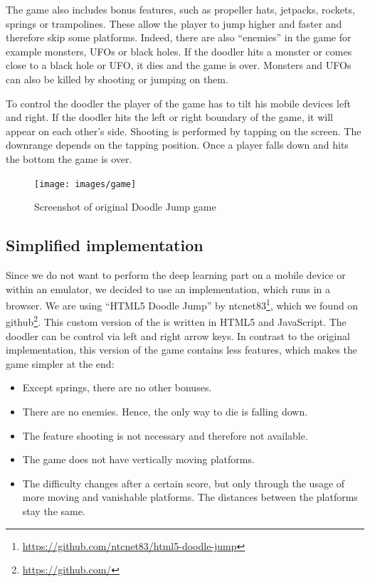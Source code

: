 \documentclass[a4paper,12pt,pagesize,headsepline,bibtotoc,titlepage,abstracton]{scrartcl}
\newcommand{\quot}[1]{{``#1''}}
\begin{document}
The game also includes bonus features, such as propeller hats, jetpacks, rockets, springs or trampolines. These allow the player to jump higher and faster and therefore skip some platforms. Indeed, there are also \quot{enemies} in the game for example monsters, UFOs or black holes. If the doodler hits a monster or comes close to a black hole or UFO, it dies and the game is over. Monsters and UFOs can also be killed by shooting or jumping on them.

To control the doodler the player of the game has to tilt his mobile devices left and right. If the doodler hits the left or right boundary of the game, it will appear on each other's side. Shooting is performed by tapping on the screen. The downrange depends on the tapping position. Once a player falls down and hits the bottom the game is over.

\begin{figure}[h]
\begin{center}
\texttt{[image: images/game]}\\
\caption{Screenshot of original Doodle Jump game}
\label{abb:doodlejumpgame}
\end{center}
\end{figure}

\subsection{Simplified implementation}
\label{sec:si}

Since we do not want to perform the deep learning part on a mobile device or within an emulator, we decided to use an implementation, which runs in a browser. We are using \quot{HTML5 Doodle Jump} by ntcnet83\footnote{\url{https://github.com/ntcnet83/html5-doodle-jump}}, which we found on github\footnote{\url{https://github.com/}}. This custom version of the is written in HTML5 and JavaScript. The doodler can be control via left and right arrow keys. In contrast to the original implementation, this version of the game contains less features, which makes the game simpler at the end:
\begin{itemize}
\item Except springs, there are no other bonuses.
\item There are no enemies. Hence, the only way to die is falling down.
\item The feature shooting is not necessary and therefore not available.
\item The game does not have vertically moving platforms.
\item The difficulty changes after a certain score, but only through the usage of more moving and vanishable platforms. The distances between the platforms stay the same.
\end{itemize}
\end{document}
